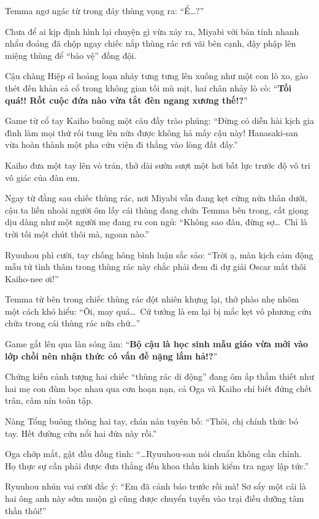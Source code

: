 \documentclass[../main.tex]{subfiles}
\begin{document}
Temma ngơ ngác từ trong đáy thùng vọng ra: ``Ể\dots?''

Chưa để ai kịp định hình lại chuyện gì vừa xảy ra, Miyabi với bản tính nhanh nhẩu đoảng đã chộp ngay chiếc nắp thùng rác rơi vãi bên cạnh, đậy phập lên miệng thùng để ``bảo vệ'' đồng đội.

Cậu chàng Hiệp sĩ hoảng loạn nhảy tưng tưng lên xuống như một con lò xo, gào thét đến khản cả cổ trong không gian tối mù mịt, hai chân nhảy lò cò: ``\textbf{Tối quá!! Rốt cuộc đứa nào vừa tắt đèn ngang xương thế!?}''

Game từ cổ tay Kaiho buông một câu đầy trào phúng: ``Đừng có diễn hài kịch gia đình làm mọi thứ rối tung lên nữa được không hả mấy cậu này! Hanasaki-san vừa hoàn thành một pha cứu viện đi thẳng vào lòng đất đấy.''

Kaiho đưa một tay lên vò trán, thở dài sườn sượt một hơi bất lực trước độ vô tri vô giác của đàn em.

Ngay từ đằng sau chiếc thùng rác, nơi Miyabi vẫn đang kẹt cứng nửa thân dưới, cậu ta liền nhoài người ôm lấy cái thùng đang chứa Temma bên trong, cất giọng dịu dàng như một người mẹ đang ru con ngủ: ``Không sao đâu, đừng sợ\dots\ Chỉ là trời tối một chút thôi mà, ngoan nào.''


Ryuuhou phì cười, tay chống hông bình luận sắc sảo: ``Trời ạ, màn kịch cảm động mẫu tử tình thâm trong thùng rác này chắc phải đem đi dự giải Oscar mất thôi Kaiho-nee ơi!''

Temma từ bên trong chiếc thùng rác đột nhiên khựng lại, thở phào nhẹ nhõm một cách khó hiểu: ``Ôi, may quá\dots\ Cứ tưởng là em lại bị mắc kẹt vô phương cứu chữa trong cái thùng rác nữa chứ\dots''

Game gắt lên qua làn sóng âm: ``\textbf{Bộ cậu là học sinh mẫu giáo vừa mới vào lớp chồi nên nhận thức có vấn đề nặng lắm hả!?}''

Chứng kiến cảnh tượng hai chiếc ``thùng rác di động'' đang ôm ấp thắm thiết như hai mẹ con đùm bọc nhau qua cơn hoạn nạn, cả Oga và Kaiho chỉ biết đứng chết trân, câm nín toàn tập.

Nàng Tổng buông thõng hai tay, chán nản tuyên bố: ``Thôi, chị chính thức bó tay. Hết đường cứu nổi hai đứa này rồi.''

Oga chớp mắt, gật đầu đồng tình: ``\dots Ryuuhou-san nói chuẩn không cần chỉnh. Họ thực sự cần phải được đưa thẳng đến khoa thần kinh kiểm tra ngay lập tức.''

Ryuuhou nhún vai cười đắc ý: ``Em đã cảnh báo trước rồi mà! Sơ sẩy một cái là hai ông anh này sớm muộn gì cũng được chuyển tuyến vào trại điều dưỡng tâm thần thôi!''
\end{document}
